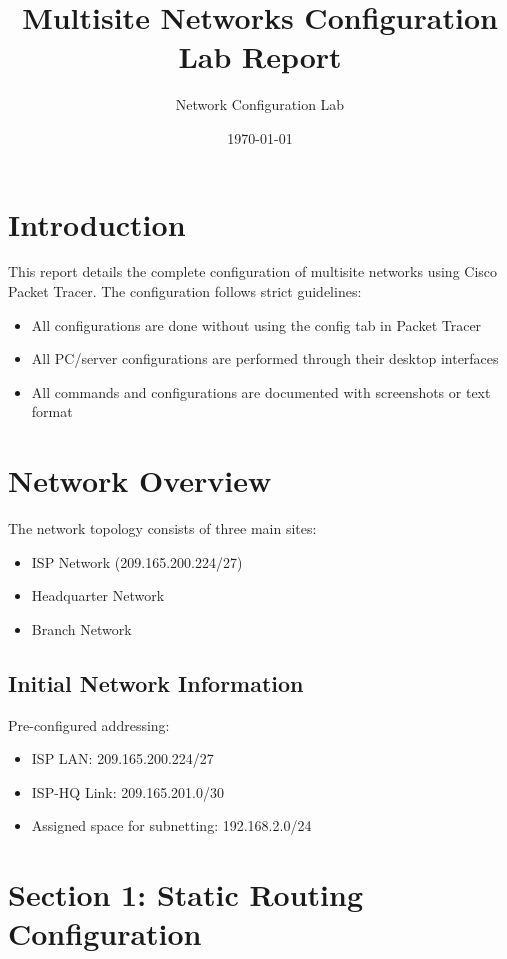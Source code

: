 \documentclass[12pt]{article}
\title{Multisite Networks Configuration Lab Report}
\author{Network Configuration Lab}
\date{\today}
\begin{document}
\maketitle

\tableofcontents
\newpage

\section{Introduction}
This report details the complete configuration of multisite networks using Cisco Packet Tracer. The configuration follows strict guidelines:
\begin{itemize}
    \item All configurations are done without using the config tab in Packet Tracer
    \item All PC/server configurations are performed through their desktop interfaces
    \item All commands and configurations are documented with screenshots or text format
\end{itemize}

\section{Network Overview}
The network topology consists of three main sites:
\begin{itemize}
    \item ISP Network (209.165.200.224/27)
    \item Headquarter Network
    \item Branch Network
\end{itemize}

\subsection{Initial Network Information}
Pre-configured addressing:
\begin{itemize}
    \item ISP LAN: 209.165.200.224/27
    \item ISP-HQ Link: 209.165.201.0/30
    \item Assigned space for subnetting: 192.168.2.0/24
\end{itemize}

\section{Section 1: Static Routing Configuration}
\end{document}
